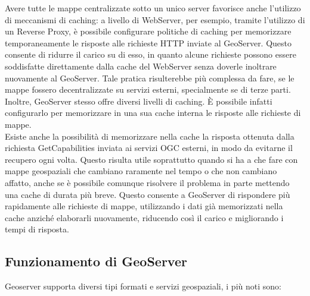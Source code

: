 Avere tutte le mappe centralizzate sotto un unico server favorisce anche l'utilizzo di meccanismi di caching: a livello di WebServer, per esempio, tramite l'utilizzo di un Reverse Proxy, è possibile configurare politiche di caching per memorizzare temporaneamente le risposte alle richieste HTTP inviate al GeoServer. Questo consente di ridurre il carico su di esso, in quanto alcune richieste possono essere soddisfatte direttamente dalla cache del WebServer senza doverle inoltrare nuovamente al GeoServer. Tale pratica risulterebbe più complessa da fare, se le mappe fossero decentralizzate su servizi esterni, specialmente se di terze parti.
\\Inoltre, GeoServer stesso offre diversi livelli di caching. È possibile infatti configurarlo per memorizzare in una sua cache interna le risposte alle richieste di mappe.
\\Esiste anche la possibilità di memorizzare nella cache la risposta ottenuta dalla richiesta GetCapabilities inviata ai servizi OGC esterni, in modo da evitarne il recupero ogni volta. Questo risulta utile soprattutto quando si ha a che fare con mappe geospaziali che cambiano raramente nel tempo o che non cambiano affatto, anche se è possibile comunque risolvere il problema in parte mettendo una cache di durata più breve. Questo consente a GeoServer di rispondere più rapidamente alle richieste di mappe, utilizzando i dati già memorizzati nella cache anziché elaborarli nuovamente, riducendo così il carico e migliorando i tempi di risposta.

\subsection{Funzionamento di GeoServer}

Geoserver supporta diversi tipi formati e servizi geospaziali, i più noti sono:

